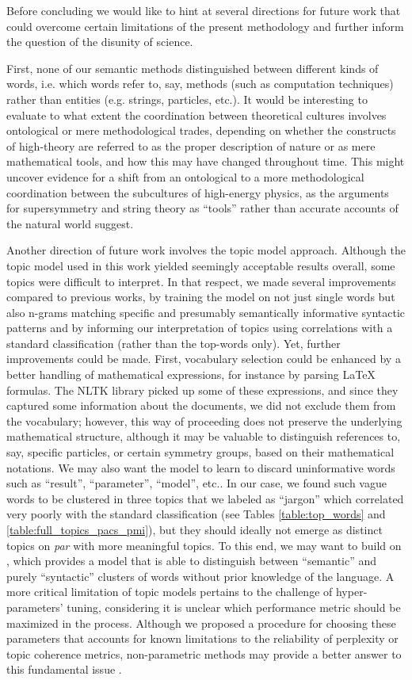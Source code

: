 \documentclass[smallextended]{svjour3}
\begin{document}
Before concluding we would like to hint at several directions for future work that could overcome certain limitations of the present methodology and further inform the question of the disunity of science.

First, none of our semantic methods distinguished between different kinds of words, i.e. which words refer to, say, methods (such as computation techniques) rather than entities  (e.g. strings, particles, etc.). It would be interesting to evaluate to what extent the coordination between theoretical cultures involves ontological or mere methodological trades, depending on whether the constructs of high-theory are referred to as the proper description of nature or as mere mathematical tools, and how this may have changed throughout time. This might uncover evidence for a shift from an ontological to a more methodological coordination between the subcultures of high-energy physics, as the arguments for supersymmetry and string theory as ``tools'' rather than accurate accounts of the natural world suggest.

Another direction of future work involves the topic model approach. Although the topic model used in this work yielded seemingly acceptable results overall, some topics were difficult to interpret. In that respect, we made several improvements compared to previous works, by training the model on not just single words but also n-grams matching specific and presumably semantically informative syntactic patterns and by informing our interpretation of topics using correlations with a standard classification (rather than the top-words only). Yet, further improvements could be made. First, vocabulary selection could be enhanced by a better handling of mathematical expressions, for instance by parsing LaTeX formulas. The NLTK library picked up some of these expressions, and since they captured some information about the documents, we did not exclude them from the vocabulary; however, this way of proceeding does not preserve the underlying mathematical structure, although it may be valuable to distinguish references to, say, specific particles, or certain symmetry groups, based on their mathematical notations. We may also want the model to learn to discard uninformative words such as ``result'', ``parameter'', ``model'', etc.. In our case, we found such vague words to be clustered in three topics that we labeled as ``jargon'' which correlated very poorly with the standard classification (see Tables \ref{table:top_words} and \ref{table:full_topics_pacs_pmi}), but they should ideally not emerge as distinct topics on \textit{par} with more meaningful topics. To this end, we may want to build on \citealt{syntax_topic_model}, which provides a model that is able to distinguish between ``semantic'' and purely ``syntactic'' clusters of words without  prior knowledge of the language. A more critical limitation of topic models pertains to the challenge of hyper-parameters' tuning, considering it is unclear which performance metric should be maximized in the process. Although we proposed a procedure for choosing these parameters that accounts for known limitations to the reliability of perplexity or topic coherence metrics, non-parametric methods may provide a better answer to this fundamental issue \citep{Gerlach2018}.
\end{document}
